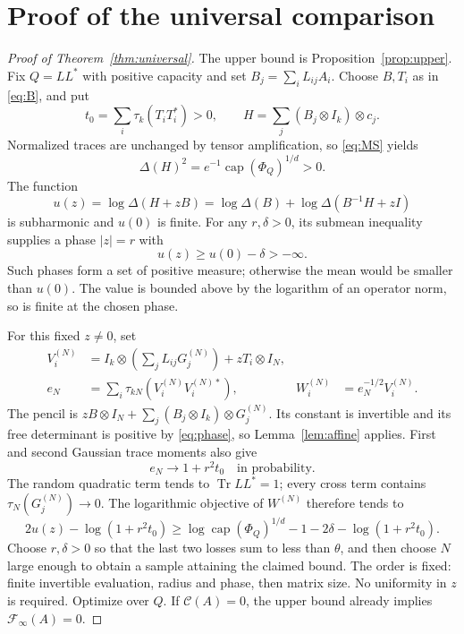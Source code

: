 \documentclass[11pt]{article}
\newcommand{\Tr}{\operatorname{Tr}}
\newcommand{\capop}{\operatorname{cap}}
\newcommand{\F}{\mathcal F}
\newcommand{\K}{\mathcal C}
\begin{document}
\section{Proof of the universal comparison}
\begin{proof}[Proof of Theorem~\ref{thm:universal}]
The upper bound is Proposition~\ref{prop:upper}. Fix $Q=LL^*$ with positive capacity and set $B_j=\sum_iL_{ij}A_i$. Choose $B,T_i$ as in \eqref{eq:B}, and put
\[
 t_0=\sum_i\tau_k(T_iT_i^*)>0,\qquad
 H=\sum_j(B_j\otimes I_k)\otimes c_j.
\]
Normalized traces are unchanged by tensor amplification, so \eqref{eq:MS} yields
\begin{equation}\label{eq:basefree}
 \Delta(H)^2=e^{-1}\capop(\Phi_Q)^{1/d}>0.
\end{equation}
The function
\[
 u(z)=\log\Delta(H+zB)=\log\Delta(B)+\log\Delta(B^{-1}H+zI)
\]
is subharmonic and $u(0)$ is finite. For any $r,\delta>0$, its submean inequality supplies a phase $|z|=r$ with
\begin{equation}\label{eq:phase}
 u(z)\ge u(0)-\delta> -\infty.
\end{equation}
Such phases form a set of positive measure; otherwise the mean would be smaller than $u(0)$. The value is bounded above by the logarithm of an operator norm, so is finite at the chosen phase.

For this fixed $z\ne0$, set
\begin{align}
 V_i^{(N)}&=I_k\otimes\left(\sum_jL_{ij}G_j^{(N)}\right)+zT_i\otimes I_N,\label{eq:Vi}\\
 e_N&=\sum_i\tau_{kN}(V_i^{(N)}V_i^{(N)*}),&W_i^{(N)}&=e_N^{-1/2}V_i^{(N)}.
\end{align}
The pencil is $zB\otimes I_N+\sum_j(B_j\otimes I_k)\otimes G_j^{(N)}$. Its constant is invertible and its free determinant is positive by \eqref{eq:phase}, so Lemma~\ref{lem:affine} applies. First and second Gaussian trace moments also give
\begin{equation}\label{eq:energy}
 e_N\longrightarrow1+r^2t_0\quad\text{in probability}.
\end{equation}
The random quadratic term tends to $\Tr LL^*=1$; every cross term contains $\tau_N(G_j^{(N)})\to0$. The logarithmic objective of $W^{(N)}$ therefore tends to
\[
 2u(z)-\log(1+r^2t_0)
 \ge\log\capop(\Phi_Q)^{1/d}-1-2\delta-\log(1+r^2t_0).
\]
Choose $r,\delta>0$ so that the last two losses sum to less than $\theta$, and then choose $N$ large enough to obtain a sample attaining the claimed bound. The order is fixed: finite invertible evaluation, radius and phase, then matrix size. No uniformity in $z$ is required. Optimize over $Q$. If $\K(A)=0$, the upper bound already implies $\F_\infty(A)=0$.
\end{proof}
\end{document}

